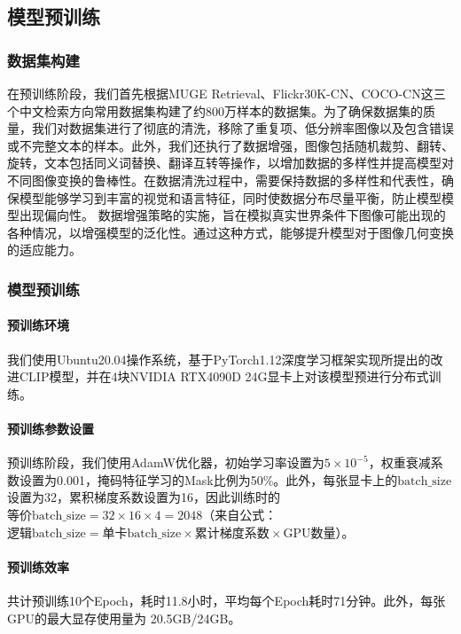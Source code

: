 \documentclass[a4paper]{zreport}
\begin{document}
\subsection{模型预训练}

\subsubsection{数据集构建}
在预训练阶段，我们首先根据MUGE Retrieval、Flickr30K-CN、COCO-CN这三个中文检索方向常用数据集构建了约800万样本的数据集。为了确保数据集的质量，我们对数据集进行了彻底的清洗，移除了重复项、低分辨率图像以及包含错误或不完整文本的样本。此外，我们还执行了数据增强，图像包括随机裁剪、翻转、旋转，文本包括同义词替换、翻译互转等操作，以增加数据的多样性并提高模型对不同图像变换的鲁棒性。在数据清洗过程中，需要保持数据的多样性和代表性，确保模型能够学习到丰富的视觉和语言特征，同时使数据分布尽量平衡，防止模型模型出现偏向性。
数据增强策略的实施，旨在模拟真实世界条件下图像可能出现的各种情况，以增强模型的泛化性。通过这种方式，能够提升模型对于图像几何变换的适应能力。


\subsubsection{模型预训练}

\paragraph{预训练环境}我们使用Ubuntu20.04操作系统，基于PyTorch1.12深度学习框架实现所提出的改进CLIP模型，并在4块NVIDIA RTX4090D 24G显卡上对该模型预进行分布式训练。

\paragraph{预训练参数设置}预训练阶段，我们使用AdamW优化器，初始学习率设置为$5 \times 10^{-5}$，权重衰减系数设置为0.001，掩码特征学习的Mask比例为50\%。此外，每张显卡上的$\mathrm{batch\_size}$设置为32，累积梯度系数设置为16，因此训练时的$\text{等价}\mathrm{batch\_size} = 32 \times 16 \times 4 = 2048$（来自公式：$\text{逻辑}\mathrm{batch\_size} = \text{单卡}\mathrm{batch\_size} \times \text{累计梯度系数} \times \text{GPU数量}$）。

\paragraph{预训练效率}共计预训练10个Epoch，耗时11.8小时，平均每个Epoch耗时71分钟。此外，每张GPU的最大显存使用量为 20.5GB/24GB。
\end{document}
